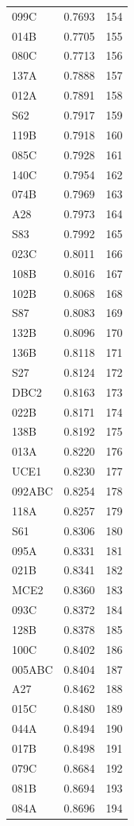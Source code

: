 \begin{longtable}{lrr}
  099C & 0.7693 & 154 \\
  014B & 0.7705 & 155 \\
  080C & 0.7713 & 156 \\
  137A & 0.7888 & 157 \\
  012A & 0.7891 & 158 \\
  S62 & 0.7917 & 159 \\
  119B & 0.7918 & 160 \\
  085C & 0.7928 & 161 \\
  140C & 0.7954 & 162 \\
  074B & 0.7969 & 163 \\
  A28 & 0.7973 & 164 \\
  S83 & 0.7992 & 165 \\
  023C & 0.8011 & 166 \\
  108B & 0.8016 & 167 \\
  102B & 0.8068 & 168 \\
  S87 & 0.8083 & 169 \\
  132B & 0.8096 & 170 \\
  136B & 0.8118 & 171 \\
  S27 & 0.8124 & 172 \\
  DBC2 & 0.8163 & 173 \\
  022B & 0.8171 & 174 \\
  138B & 0.8192 & 175 \\
  013A & 0.8220 & 176 \\
  UCE1 & 0.8230 & 177 \\
  092ABC & 0.8254 & 178 \\
  118A & 0.8257 & 179 \\
  S61 & 0.8306 & 180 \\
  095A & 0.8331 & 181 \\
  021B & 0.8341 & 182 \\
  MCE2 & 0.8360 & 183 \\
  093C & 0.8372 & 184 \\
  128B & 0.8378 & 185 \\
  100C & 0.8402 & 186 \\
  005ABC & 0.8404 & 187 \\
  A27 & 0.8462 & 188 \\
  015C & 0.8480 & 189 \\
  044A & 0.8494 & 190 \\
  017B & 0.8498 & 191 \\
  079C & 0.8684 & 192 \\
  081B & 0.8694 & 193 \\
  084A & 0.8696 & 194 \\

\end{longtable}
